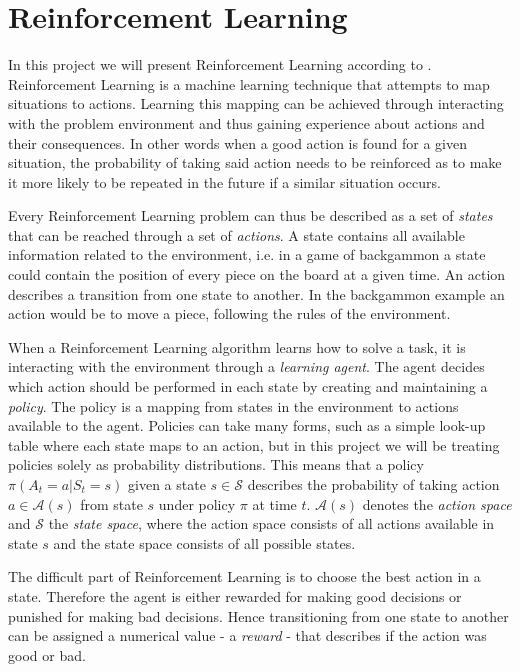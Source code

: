 \documentclass[11pt]{article}
\begin{document}
\maketitle

\section{Reinforcement Learning}

In this project we will present Reinforcement Learning according to
\cite{RLbook}.
Reinforcement Learning is a machine learning technique that attempts 
to map situations to actions.
Learning this mapping can be achieved through interacting with the problem
environment and thus gaining experience about actions and their consequences.
In other words when a good action is found for a given situation,
the probability of taking said action needs to be reinforced
as to make it more likely to be
repeated in the future if a similar situation occurs.

Every Reinforcement Learning problem can thus be described as a set of \textit{states} that can be reached
through a set of \textit{actions}.
A state contains all available information related to the environment,
i.e. in a game of backgammon a state could contain the position of every piece on the board at
a given time.
An action describes a transition from one state to another.
In the backgammon example an action would be to move a piece, following the rules of the
environment.

When a Reinforcement Learning algorithm learns how to solve a task, it is
interacting with the environment through a \textit{learning agent}.
The agent decides which action should be performed in each state by creating and maintaining a \textit{policy}.
The policy is a mapping from states in the environment to actions available to the agent.
Policies can take many forms, such as a simple look-up table where each state maps to an
action, but in this project we will be treating policies solely as probability distributions.
This means that a policy $\pi(A_t = a|S_t = s)$ given a state $s \in \mathcal{S}$ describes the
probability of taking action $a \in \mathcal{A}(s)$ from state $s$ under policy $\pi$ at time $t$.
$\mathcal{A}(s)$ denotes the \textit{action space} and $\mathcal{S}$ the \textit{state space},
where the action space consists of all actions available in state $s$ and the state space consists of
all possible states.

The difficult part of Reinforcement Learning is to choose the best action in a
state.
Therefore the agent is either rewarded for making good decisions or punished for making bad decisions.
Hence transitioning from one state to another can be assigned a numerical value
- a \textit{reward} - that describes if the action was good or bad.
\end{document}
